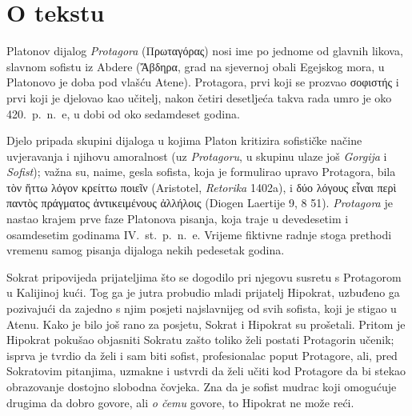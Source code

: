 


\section*{O tekstu}

Platonov dijalog \textit{Protagora} (Πρωταγόρας) nosi ime po jednome od glavnih likova, slavnom sofistu iz Abdere (\textgreek[variant=ancient]{Ἄβδηρα}, grad na sjevernoj obali Egejskog mora, u Platonovo je doba pod vlašću Atene). Protagora, prvi koji se prozvao \textgreek[variant=ancient]{σοφιστής} i prvi koji je djelovao kao učitelj, nakon četiri desetljeća takva rada umro je oko 420.\ p.~n.~e, u dobi od oko sedamdeset godina. 

Djelo pripada skupini dijaloga u kojima Platon kritizira sofističke
načine uvjeravanja i njihovu amoralnost (uz \textit{Protagoru}, u skupinu ulaze još \textit{Gorgija} i \textit{Sofist}); važna su, naime, gesla sofista, koja je formulirao upravo Protagora, bila \textgreek[variant=ancient]{τὸν ἥττω λόγον κρείττω ποιεῖν} (Aristotel, \textit{Retorika} 1402a), i \textgreek[variant=ancient]{δύο λόγους εἶναι περὶ παντὸς πράγματος ἀντικειμένους ἀλλήλοις} (Diogen Laertije 9, 8 51). \textit{Protagora} je nastao krajem prve faze Platonova pisanja, koja traje u devedesetim i osamdesetim godinama IV.~st.\ p.~n.~e. Vrijeme fiktivne radnje stoga prethodi vremenu samog pisanja dijaloga nekih pedesetak godina.

Sokrat pripovijeda prijateljima što se dogodilo pri njegovu susretu s Protagorom u Kalijinoj kući. Tog ga je jutra probudio mladi prijatelj Hipokrat, uzbuđeno ga pozivajući da zajedno s njim posjeti najslavnijeg od svih sofista, koji je stigao u Atenu. Kako je bilo još rano za posjetu, Sokrat i Hipokrat su prošetali. Pritom je Hipokrat pokušao objasniti Sokratu zašto toliko želi postati Protagorin učenik; isprva je tvrdio da želi i sam biti sofist, profesionalac poput Protagore, ali, pred Sokratovim pitanjima, uzmakne i ustvrdi da želi učiti kod Protagore da bi stekao obrazovanje dostojno slobodna čovjeka. Zna da je sofist mudrac koji omogućuje drugima da dobro govore, ali \textit{o čemu} govore, to Hipokrat ne može reći.

